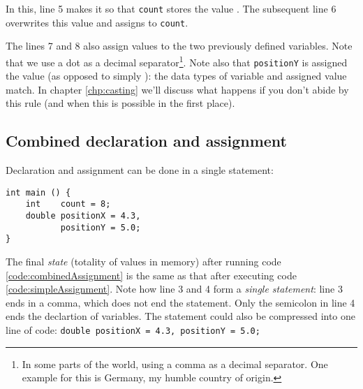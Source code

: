 In this, line 5 makes it so that \texttt{count} stores the value . The subsequent line 6 overwrites this value and assigns  to \texttt{count}.

The lines 7 and 8 also assign values to the two previously defined  variables. Note that we use a dot as a decimal separator\footnote{In some parts of the world, using a comma as a decimal separator. One example for this is Germany, my humble country of origin.}. Note also that \texttt{positionY} is assigned the value  (as opposed to simply ): the data types of variable and assigned value match. In chapter \ref{chp:casting} we'll discuss what happens if you don't abide by this rule (and when this is possible in the first place).


\subsection{Combined declaration and assignment} \label{sec:valueAssignment}
Declaration and assignment can be done in a single statement:
\begin{codebox}[combinedAssignments.c]
\begin{verbatim}
int main () {
    int    count = 8;
    double positionX = 4.3,
           positionY = 5.0;
}
\end{verbatim}
 \label{code:combinedAssignment}
\end{codebox}

The final \emph{state} (\ie totality of values in memory) after running code \ref{code:combinedAssignment} is the same as that after executing code \ref{code:simpleAssignment}. Note how line 3 and 4 form a \emph{single statement}: line 3 ends in a comma, which does not end the statement. Only the semicolon in line 4 ends the declartion of  variables. The statement could also be compressed into one line of code: \texttt{double positionX = 4.3, positionY = 5.0;}

